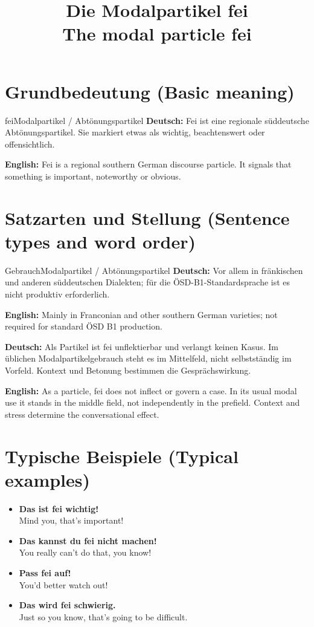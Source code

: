 \documentclass[a4paper,11pt]{article}
\title{Die Modalpartikel \glqq fei\grqq\\{\large\textnormal{The modal particle fei}}}
\date{}
\newcommand{\GermanText}[1]{\textbf{Deutsch: }#1\par}
\newcommand{\EnglishText}[1]{{\small\color{SoftGray}\textbf{English: }#1\par}}
\newcommand{\ExampleItem}[2]{\item \textbf{#1}\\{\small\color{SoftGray}#2}}
\begin{document}
\maketitle
\tableofcontents
\section{Grundbedeutung \textnormal{(Basic meaning)}}
\begin{grammarentry}{fei}{Modalpartikel / Abtönungspartikel}
\GermanText{Fei ist eine regionale süddeutsche Abtönungspartikel. Sie markiert etwas als wichtig, beachtenswert oder offensichtlich.}
\EnglishText{Fei is a regional southern German discourse particle. It signals that something is important, noteworthy or obvious.}
\end{grammarentry}
\section{Satzarten und Stellung \textnormal{(Sentence types and word order)}}
\begin{grammarentry}{Gebrauch}{Modalpartikel / Abtönungspartikel}
\GermanText{Vor allem in fränkischen und anderen süddeutschen Dialekten; für die ÖSD-B1-Standardsprache ist es nicht produktiv erforderlich.}
\EnglishText{Mainly in Franconian and other southern German varieties; not required for standard ÖSD B1 production.}
\end{grammarentry}
\GermanText{Als Partikel ist fei unflektierbar und verlangt keinen Kasus. Im üblichen Modalpartikelgebrauch steht es im Mittelfeld, nicht selbstständig im Vorfeld. Kontext und Betonung bestimmen die Gesprächswirkung.}
\EnglishText{As a particle, fei does not inflect or govern a case. In its usual modal use it stands in the middle field, not independently in the prefield. Context and stress determine the conversational effect.}
\section{Typische Beispiele \textnormal{(Typical examples)}}
\begin{exbox}\begin{itemize}
\ExampleItem{Das ist fei wichtig!}{Mind you, that's important!}
\ExampleItem{Das kannst du fei nicht machen!}{You really can't do that, you know!}
\ExampleItem{Pass fei auf!}{You'd better watch out!}
\ExampleItem{Das wird fei schwierig.}{Just so you know, that's going to be difficult.}
\end{itemize}\end{exbox}
\end{document}
